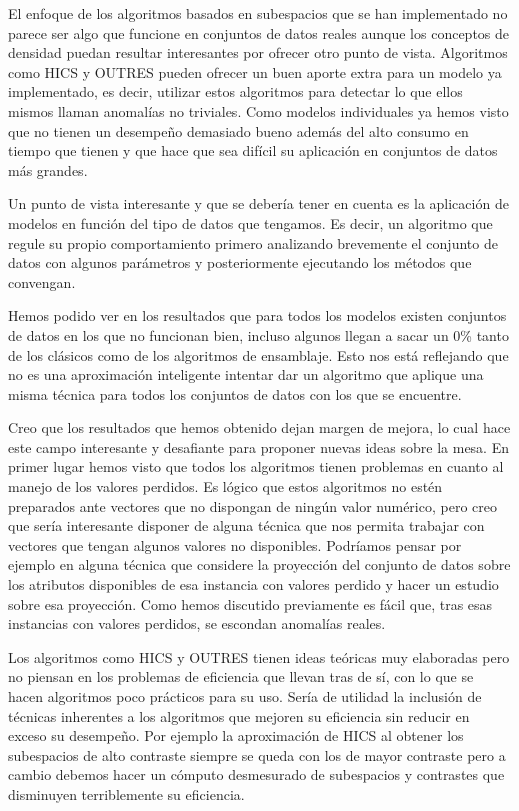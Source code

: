 El enfoque de los algoritmos basados en subespacios que se han implementado no parece ser algo que funcione en conjuntos de datos reales aunque los conceptos de densidad puedan resultar interesantes por ofrecer otro punto de vista. Algoritmos como HICS y OUTRES pueden ofrecer un buen aporte extra para un modelo ya implementado, es decir, utilizar estos algoritmos para detectar lo que ellos mismos llaman anomalías no triviales. Como modelos individuales ya hemos visto que no tienen un desempeño demasiado bueno además del alto consumo en tiempo que tienen y que hace que sea difícil su aplicación en conjuntos de datos más grandes. 

Un punto de vista interesante y que se debería tener en cuenta es la aplicación de modelos en función del tipo de datos que tengamos. Es decir, un algoritmo que regule su propio comportamiento primero analizando brevemente el conjunto de datos con algunos parámetros y posteriormente ejecutando los métodos que convengan. 

Hemos podido ver en los resultados que para todos los modelos existen conjuntos de datos en los que no funcionan bien, incluso algunos llegan a sacar un 0\% tanto de los clásicos como de los algoritmos de ensamblaje. Esto nos está reflejando que no es una aproximación inteligente intentar dar un algoritmo que aplique una misma técnica para todos los conjuntos de datos con los que se encuentre.

Creo que los resultados que hemos obtenido dejan margen de mejora, lo cual hace este campo interesante y desafiante para proponer nuevas ideas sobre la mesa. En primer lugar hemos visto que todos los algoritmos tienen problemas en cuanto al manejo de los valores perdidos. Es lógico que estos algoritmos no estén preparados ante vectores que no dispongan de ningún valor numérico, pero creo que sería interesante disponer de alguna técnica que nos permita trabajar con vectores que tengan algunos valores no disponibles. Podríamos pensar por ejemplo en alguna técnica que considere la proyección del conjunto de datos sobre los atributos disponibles de esa instancia con valores perdido y hacer un estudio sobre esa proyección. Como hemos discutido previamente es fácil que, tras esas instancias con valores perdidos, se escondan anomalías reales. 

Los algoritmos como HICS y OUTRES tienen ideas teóricas muy elaboradas pero no piensan en los problemas de eficiencia que llevan tras de sí, con lo que se hacen algoritmos poco prácticos para su uso. Sería de utilidad la inclusión de técnicas inherentes a los algoritmos que mejoren su eficiencia sin reducir en exceso su desempeño. Por ejemplo la aproximación de HICS al obtener los subespacios de alto contraste siempre se queda con los de mayor contraste pero a cambio debemos hacer un cómputo desmesurado de subespacios y contrastes que disminuyen terriblemente su eficiencia.

